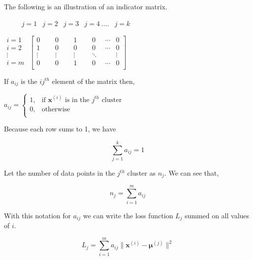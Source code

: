 \documentclass[english]{article}
\theoremstyle{plain}
\begin{document}
The following is an illustration of 
an indicator matrix.

\bigskip

$
\begin{matrix}
\:\;\;\;\;\;\;\; j=1 & j=2 & j=3 & j=4\:....&j=k
\end{matrix}
$

$
\begin{matrix}
i = 1 \\
i = 2 \\
\vdots \\
i=m \\
\end{matrix}
$
$
\begin{bmatrix}
0 \;\;\;\;\; & 0 \;\;\;\;\; & 1 \;\;\;\;\; & 0 \;\;\;\;\; \cdots & 0 \\
1 \;\;\;\;\; & 0 \;\;\;\;\; & 0 \;\;\;\;\; & 0 \;\;\;\;\; \cdots & 0 \\
\vdots & \vdots & \vdots & \ddots & \vdots \\
0 \;\;\;\;\; & 0 \;\;\;\;\; & 1 \;\;\;\;\; & 0 \;\;\;\;\; \cdots & 0 \\
\end{bmatrix}
$

If $a_{ij}$ is the ${ij}^{th}$ element of the matrix then,

$
a_{ij} =
\begin{cases}
1, & \text{if $\boldsymbol{x}^{(i)}$ is in the $j^{th}$ cluster} \\
0, & \text{otherwise} \\
\end{cases}
$

Because each row sums to 1, we have

\begin{equation}
\sum_{j=1}^{k} a_{ij} = 1
\end{equation}

Let the number of data points in the $j^{th}$ cluster as $n_{j}$. We can see that,

\begin{equation}
n_{j} = \sum_{i=1}^{m} a_{ij}
\end{equation}

With this notation for $a_{ij}$ we can write the loss function $L_{j}$ summed on all values of $i$.

\begin{equation}
L_{j} = \sum_{i=1}^{m} a_{ij} \| \boldsymbol{x}^{(i)} - \boldsymbol{\mu}^{(j)} \|^{2}
\end{equation}
\end{document}
